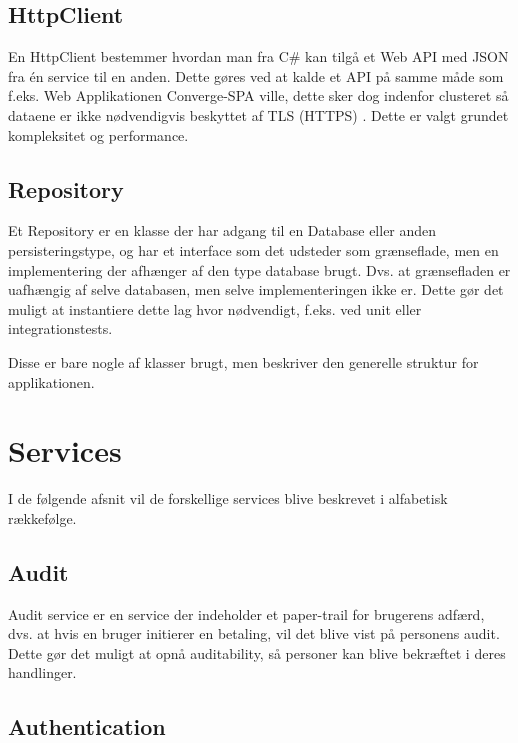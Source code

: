 \subsection{HttpClient}

En HttpClient bestemmer hvordan man fra C\# kan tilgå et Web API med JSON fra én service til en anden. Dette gøres ved at kalde et API på samme måde som f.eks. Web Applikationen Converge-SPA ville, dette sker dog indenfor clusteret så dataene er ikke nødvendigvis beskyttet af TLS (HTTPS) \cite[TLS]{converge-terms}. Dette er valgt grundet kompleksitet og performance.

\subsection{Repository}

Et Repository er en klasse der har adgang til en Database eller anden persisteringstype, og har et interface som det udsteder som grænseflade, men en implementering der afhænger af den type database brugt. Dvs. at grænsefladen er uafhængig af selve databasen, men selve implementeringen ikke er. Dette gør det muligt at instantiere dette lag hvor nødvendigt, f.eks. ved unit eller integrationstests.


Disse er bare nogle af klasser brugt, men beskriver den generelle struktur for applikationen.


\section{Services}

I de følgende afsnit vil de forskellige services blive beskrevet i alfabetisk rækkefølge.

\subsection{Audit}
\label{sec:audit-service}

Audit service er en service der indeholder et paper-trail for brugerens adfærd, dvs. at hvis en bruger initierer en betaling, vil det blive vist på personens audit. Dette gør det muligt at opnå auditability, så personer kan blive bekræftet i deres handlinger.

\subsection{Authentication}
\label{sec:authentication-service}

